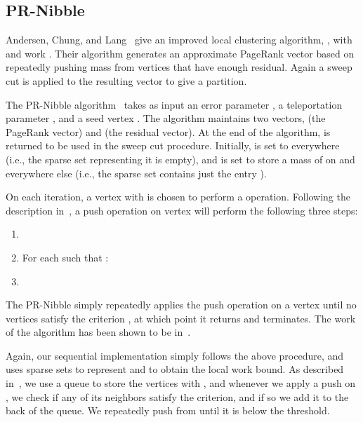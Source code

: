 \subsection{PR-Nibble}\label{sec:pr-nibble}
Andersen, Chung, and Lang~\cite{Andersen2006} give an improved local
clustering algorithm, , with  and work .
Their algorithm generates an approximate PageRank vector based on
repeatedly pushing mass from vertices that have enough
residual. Again a sweep cut is applied to the resulting vector
to give a partition. 


The PR-Nibble algorithm~\cite{Andersen2006} takes as input
an error parameter , a teleportation parameter , and a
seed vertex . The algorithm maintains two vectors,  (the PageRank
vector) and  (the residual vector).  At the end of the algorithm,
 is returned to be used in the sweep cut procedure. Initially,
 is set to  everywhere (i.e., the sparse set representing it is
empty), and  is set to store a mass of  on  and  everywhere
else (i.e., the sparse set contains just the entry ).

On each iteration, a vertex  with  is chosen
to perform a  operation.  Following the description
in~\cite{Andersen2006}, a push operation on vertex  will perform
the following three steps:
\begin{enumerate}[itemsep=0pt,topsep=3pt]
\item 
\item For each  such that : \par
 \hspace{4ex} 
\item 
\end{enumerate}
The PR-Nibble simply repeatedly applies the push operation on a vertex
until no vertices satisfy the criterion , at
which point it returns  and terminates. The work of the algorithm
has been shown to be  in~\cite{Andersen2006}.

Again, our sequential implementation simply follows the above
procedure, and uses sparse sets to represent  and  to obtain
the local work bound. As described in~\cite{Andersen2006}, we use a
queue to store the vertices with , and
whenever we apply a push on , we check if any of its neighbors
satisfy the criterion, and if so we add it to the back of the
queue. We repeatedly push from  until it is below the threshold.

